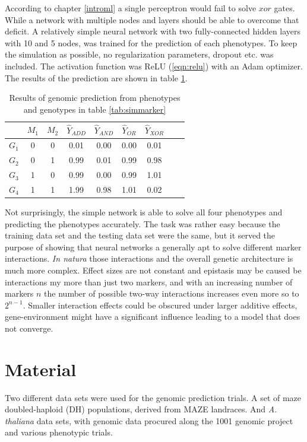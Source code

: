 According to chapter \ref{introml} a single perceptron would fail to solve $xor$ gates. While a network with
multiple nodes and layers should be able to overcome that deficit. A relatively simple neural network with two
fully-connected hidden layers with 10 and 5 nodes, was trained for the prediction of each phenotypes. To keep
the simulation as possible, no regularization parameters, dropout etc. was included. The activation function
was ReLU (\ref{eqn:relu}) with an Adam optimizer. The results of the prediction are shown in table
\ref{tab:simgpres}.

\begin{table}[H]
\caption{Results of genomic prediction from phenotypes and genotypes in table \ref{tab:simmarker}}
\label{tab:simgpres}
\centering
\begin{tabular}{ l c c | c c c c c c }
 \toprule
 & $M_1$ & $M_2$ & $\hat{Y}_{ADD}$ & $\hat{Y}_{AND}$ & $\hat{Y}_{OR}$ & $\hat{Y}_{XOR}$\\
 \midrule
 \hline 
 $G_1$ & 0 & 0 & 0.01 & 0.00 & 0.00 & 0.01 \\
 $G_2$ & 0 & 1 & 0.99 & 0.01 & 0.99 & 0.98 \\
 $G_3$ & 1 & 0 & 0.99 & 0.00 & 0.99 & 1.01 \\
 $G_4$ & 1 & 1 & 1.99 & 0.98 & 1.01 & 0.02 \\
 \bottomrule
\end{tabular}
\end{table}


Not surprisingly, the simple network is able to solve all four phenotypes and predicting the phenotypes
accurately. The task was rather easy because the training data set and the testing data set were the same, but
it served the purpose of showing that neural networks a generally apt to solve different marker
interactions. \textit{In natura} those interactions and the overall genetic architecture is much more
complex. Effect sizes are not constant and epistasis may be caused be interactions my more than just two
markers, and with an increasing number of markers $n$ the number of possible two-way interactions increases
even more so to $2^{n-1}$. Smaller interaction effects could be obscured under larger additive effects,
gene-environment might have a significant influence leading to a model that does not converge.


\section{Material}
Two different data sets were used for the genomic prediction trials.
A set of maze doubled-haploid (DH) populations, derived from MAZE landraces. And \textit{A. thaliana} data sets, with genomic data procured along the 1001 genomic project \cite{1001genome} and various phenotypic trials.


